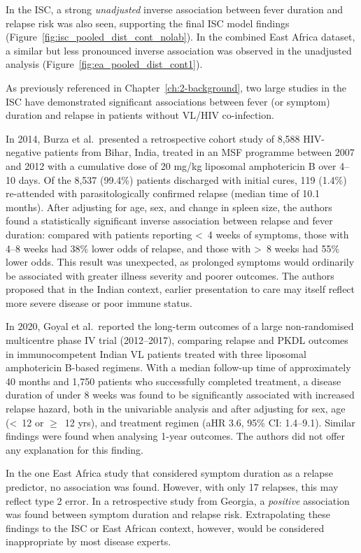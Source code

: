 In the ISC, a strong \textit{unadjusted} inverse association between fever duration and relapse risk was also seen, supporting the final ISC model findings (Figure~\ref{fig:isc_pooled_dist_cont_nolab}). In the combined East Africa dataset, a similar but less pronounced inverse association was observed in the unadjusted analysis (Figure~\ref{fig:ea_pooled_dist_cont1}).

As previously referenced in Chapter~\ref{ch:2-background}, two large studies in the ISC have demonstrated significant associations between fever (or symptom) duration and relapse in patients without VL/HIV co-infection.

In 2014, Burza et al.\ presented a retrospective cohort study of 8,588 HIV-negative patients from Bihar, India, treated in an MSF programme between 2007 and 2012 with a cumulative dose of 20 mg/kg liposomal amphotericin B over 4--10 days\cite{burza2014}. Of the 8,537 (99.4\%) patients discharged with initial cures, 119 (1.4\%) re-attended with parasitologically confirmed relapse (median time of 10.1 months). After adjusting for age, sex, and change in spleen size, the authors found a statistically significant inverse association between relapse and fever duration: compared with patients reporting <~4 weeks of symptoms, those with 4--8 weeks had 38\% lower odds of relapse, and those with >~8 weeks had 55\% lower odds. This result was unexpected, as prolonged symptoms would ordinarily be associated with greater illness severity and poorer outcomes. The authors proposed that in the Indian context, earlier presentation to care may itself reflect more severe disease or poor immune status.

In 2020, Goyal et al.\ reported the long-term outcomes of a large non-randomised multicentre phase IV trial (2012--2017), comparing relapse and PKDL outcomes in immunocompetent Indian VL patients treated with three liposomal amphotericin B-based regimens\cite{goyal2018, goyal2020}. With a median follow-up time of approximately 40 months and 1,750 patients who successfully completed treatment, a disease duration of under 8 weeks was found to be significantly associated with increased relapse hazard, both in the univariable analysis and after adjusting for sex, age (<~12 or $\geq$~12 yrs), and treatment regimen (aHR 3.6, 95\% CI: 1.4--9.1). Similar findings were found when analysing 1-year outcomes\cite{goyal2019}. The authors did not offer any explanation for this finding.

In the one East Africa study that considered symptom duration as a relapse predictor, no association was found. However, with only 17 relapses, this may reflect type 2 error\cite{kennedy2024}. In a retrospective study from Georgia, a \textit{positive} association was found between symptom duration and relapse risk\cite{kajaia2011}. Extrapolating these findings to the ISC or East African context, however, would be considered inappropriate by most disease experts.

